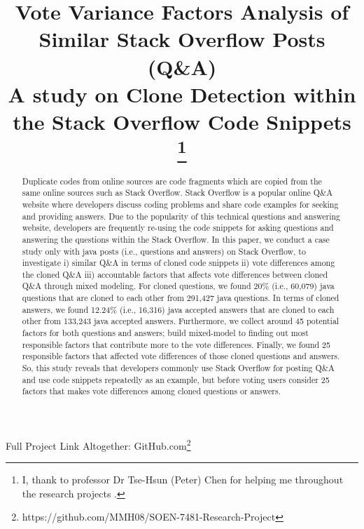 \documentclass[conference]{IEEEtran}
\begin{document}
	
	\title{Vote Variance Factors Analysis of Similar Stack Overflow Posts (Q\&A) \\
		{\footnotesize \textsuperscript{}A study on Clone Detection within the Stack Overflow Code Snippets}
		\thanks{I, thank to professor Dr Tse-Hsun (Peter) Chen for helping me throughout the research projects .}
	}
	
	\author{
	}
	
	\maketitle
	Full Project Link Altogether: GitHub.com\footnote{ https://github.com/MMH08/SOEN-7481-Research-Project} \newline
	
	\begin{abstract}
		Duplicate codes from online sources are code fragments which are copied from the same online sources such as Stack Overflow. Stack Overflow is a popular online Q\&A website where developers discuss coding problems and share code examples for seeking and providing answers. Due to the popularity of this technical questions and answering website, developers are frequently re-using the code snippets for asking questions and answering the questions within the Stack Overflow. In this paper, we conduct a case study only with java posts (i.e., questions and answers) on Stack Overflow, to investigate i) similar Q\&A in terms of cloned code snippets ii) vote differences among the cloned Q\&A iii) accountable factors that affects vote differences between cloned Q\&A through mixed modeling. For cloned questions, we found 20\% (i.e., 60,079) java questions that are cloned to each other from 291,427 java questions. In terms of cloned answers, we found 12.24\% (i.e., 16,316) java accepted answers that are cloned to each other from 133,243 java accepted answers. Furthermore, we collect around 45 potential factors for both questions and answers; build mixed-model to finding out most responsible factors that contribute more to the vote differences. Finally, we found 25 responsible factors that affected vote differences of those cloned questions and answers. So, this study reveals that developers commonly use Stack Overflow for posting Q\&A and use code snippets repeatedly as an example, but before voting users consider 25 factors that makes vote differences among cloned questions or answers. 
		
	\end{abstract}
	
\end{document}
